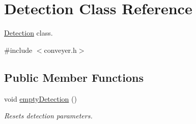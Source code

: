 \hypertarget{classDetection}{}\section{Detection Class Reference}
\label{classDetection}


\hyperlink{classDetection}{Detection} class.  




{\ttfamily \#include $<$conveyer.\+h$>$}

\subsection*{Public Member Functions}
\begin{DoxyCompactItemize}
\item 
void \hyperlink{classDetection_ab9da7e3347faeced1a83edbdbb9843ee}{empty\+Detection} ()
\begin{DoxyCompactList}\small\item\em Resets detection parameters. \end{DoxyCompactList}\end{DoxyCompactItemize}

